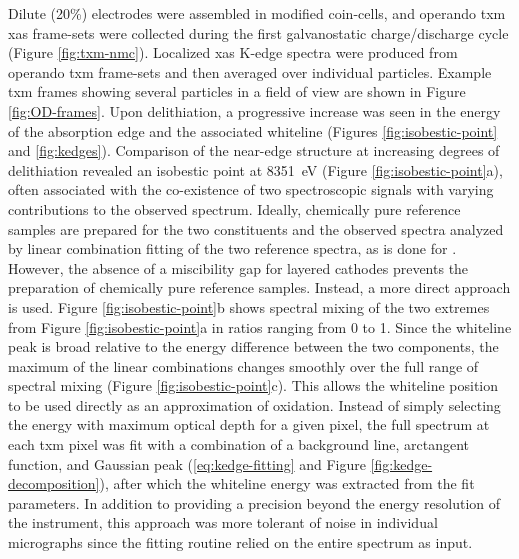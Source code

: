 \documentclass{article}
\begin{document}
Dilute (20\%) \nmc[333]{} electrodes were assembled in modified
coin-cells, and operando \gls{txm} \gls{xas} frame-sets were collected
during the first galvanostatic charge/discharge cycle (Figure
\ref{fig:txm-nmc}). Localized \gls{xas} K-edge spectra were produced
from operando \gls{txm} frame-sets and then averaged over individual
particles. Example \gls{txm} frames showing several particles in a
field of view are shown in Figure \ref{fig:OD-frames}. Upon
delithiation, a progressive increase was seen in the energy of the
absorption edge and the associated whiteline (Figures
\ref{fig:isobestic-point} and \ref{fig:kedges}). Comparison of the
 near-edge structure at increasing degrees of delithiation
revealed an isobestic point at \SI{8351}{eV} (Figure
\ref{fig:isobestic-point}a), often associated with the co-existence of
two spectroscopic signals with varying contributions to the observed
spectrum. Ideally, chemically pure reference samples are prepared for
the two constituents and the observed spectra analyzed by linear
combination fitting of the two reference spectra, as is done for
\cite{wanli2016}. However, the absence of a miscibility
gap for layered cathodes prevents the preparation of chemically pure
reference samples. Instead, a more direct approach is used. Figure
\ref{fig:isobestic-point}b shows spectral mixing of the two extremes
from Figure \ref{fig:isobestic-point}a in ratios ranging from 0 to
1. Since the whiteline peak is broad relative to the energy difference
between the two components, the maximum of the linear combinations
changes smoothly over the full range of spectral mixing (Figure
\ref{fig:isobestic-point}c). This allows the whiteline position to be
used directly as an approximation of  oxidation. Instead of
simply selecting the energy with maximum optical depth for a given
pixel, the full spectrum at each \gls{txm} pixel was fit with a
combination of a background line, arctangent function, and Gaussian
peak (\ref{eq:kedge-fitting} and Figure
\ref{fig:kedge-decomposition}), after which the whiteline energy was
extracted from the fit parameters. In addition to providing a
precision beyond the energy resolution of the instrument, this
approach was more tolerant of noise in individual micrographs since
the fitting routine relied on the entire spectrum as input.


\end{document}

